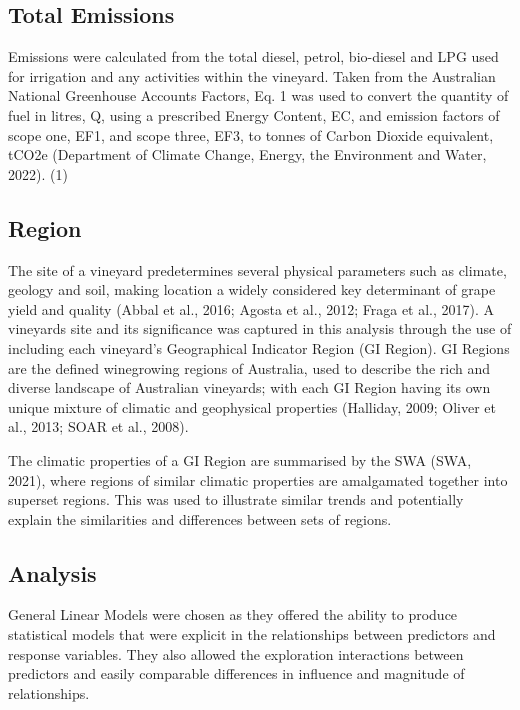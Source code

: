 \documentclass[
  journal=large,
  manuscript=article-type,
  year=2023,
  volume=?,
]{cup-journal}
\begin{document}
\subsection{Total Emissions}
Emissions were calculated from the total diesel, petrol, bio-diesel and LPG used for irrigation and any activities within the vineyard. Taken from the Australian National Greenhouse Accounts Factors, Eq. 1 was used to convert the quantity of fuel in litres, Q, using a prescribed Energy Content, EC, and emission factors of scope one, EF1, and scope three, EF3, to tonnes of Carbon Dioxide equivalent, tCO2e (Department of Climate Change, Energy, the Environment and Water, 2022).
 									(1)

\subsection{Region}
The site of a vineyard predetermines several physical parameters such as climate, geology and soil, making location a widely considered key determinant of grape yield and quality (Abbal et al., 2016; Agosta et al., 2012; Fraga et al., 2017). A vineyards site and its significance was captured in this analysis through the use of including each vineyard’s Geographical Indicator Region (GI Region). GI Regions are the defined winegrowing regions of Australia, used to describe the rich and diverse landscape of Australian vineyards; with each GI Region having its own unique mixture of climatic and geophysical properties (Halliday, 2009; Oliver et al., 2013; SOAR et al., 2008).

The climatic properties of a GI Region are summarised by the SWA (SWA, 2021), where regions of similar climatic properties are amalgamated together into superset regions. This was used to illustrate similar trends and potentially explain the similarities and differences between sets of regions.

\subsection{Analysis}
General Linear Models were chosen as they offered the ability to produce statistical models that were explicit in the relationships between predictors and response variables. They also allowed the exploration interactions between predictors and easily comparable differences in influence and magnitude of relationships.
\end{document}
